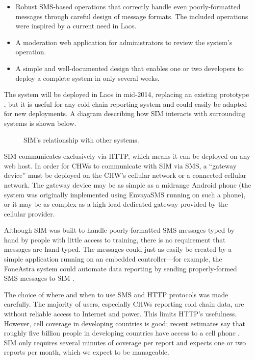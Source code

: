 \documentclass{acm_proc_article-sp}
\begin{document}
\begin{itemize}
\item Robust SMS-based operations that correctly handle even poorly-formatted messages through careful design of message formats. The included operations were inspired by a current need in Laos.
\item A moderation web application for administrators to review the system's operation.
\item A simple and well-documented design that enables one or two developers to deploy a complete system in only several weeks.
\end{itemize}

The system will be deployed in Laos in mid-2014, replacing an existing prototype \cite{unicefstories}, but it is useful for any cold chain reporting system and could easily be adapted for new deployments. A diagram describing how SIM interacts with surrounding systems is shown below.

\begin{figure*}
\centering
{}
\caption{SIM's relationship with other systems.}
\end{figure*}

SIM communicates exclusively via HTTP, which means it can be deployed on any web host. In order for CHWs to communicate with SIM via SMS, a ``gateway device'' must be deployed on the CHW's cellular network or a connected cellular network. The gateway device may be as simple as a midrange Android phone (the system was originally implemented using EnvayaSMS running on such a phone), or it may be as complex as a high-load dedicated gateway provided by the cellular provider. 

Although SIM was built to handle poorly-formatted SMS messages typed by hand by people with little access to training, there is no requirement that messages are hand-typed. The messages could just as easily be created by a simple application running on an embedded controller---for example, the FoneAstra system could automate data reporting by sending properly-formed SMS messages to SIM \cite{foneastra}.

The choice of where and when to use SMS and HTTP protocols was made carefully. The majority of users, especially CHWs reporting cold chain data, are without reliable access to Internet and power. This limits HTTP's usefulness. However, cell coverage in developing countries is good; recent estimates say that roughly five billion people in developing countries have access to a cell phone \cite{worldbank:mobileaccess}. SIM only requires several minutes of coverage per report and expects one or two reports per month, which we expect to be manageable.
\end{document}
